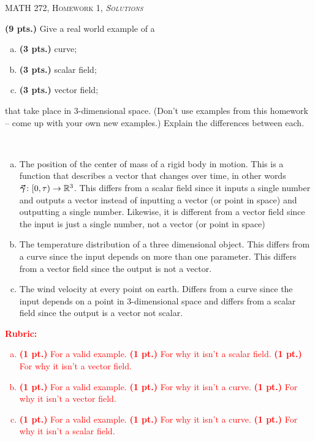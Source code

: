 \documentclass[12pt]{article} %
\begin{document}
\begin{center}
   \textsc{\large MATH 272, Homework 1, \emph{Solutions}}\\
\end{center}
\vspace{.5cm}

\begin{problem}
\textbf{(9 pts.)} Give a real world example of a
\begin{enumerate}[(a)]
    \item \textbf{(3 pts.)} curve;
    \item \textbf{(3 pts.)} scalar field;
    \item \textbf{(3 pts.)} vector field;
\end{enumerate}
that take place in 3-dimensional space. (Don't use examples from this homework -- come up with your own new examples.) Explain the differences between each.
\end{problem}
\begin{solution}~
\begin{enumerate}[(a)]
    \item The position of the center of mass of a rigid body in motion. This is a function that describes a vector that changes over time, in other words $\boldsymbol{\vec{\gamma}} \colon [0,\tau ) \to \mathbb{R}^3$. This differs from a scalar field since it inputs a single number and outputs a vector instead of inputting a vector (or point in space) and outputting a single number. Likewise, it is different from a vector field since the input is just a single number, not a vector (or point in space)
    \item The temperature distribution of a three dimensional object. This differs from a curve since the input depends on more than one parameter. This differs from a vector field since the output is not a vector.
    \item The wind velocity at every point on earth. Differs from a curve since the input depends on a point in 3-dimensional space and differs from a scalar field since the output is a vector not scalar.
\end{enumerate}
\end{solution}
\vspace*{1cm}
\textcolor{red}{
\noindent \textbf{Rubric:}
\begin{enumerate}[(a)]
    \item \textbf{(1 pt.)} For a valid example. \textbf{(1 pt.)} For why it isn't a scalar field. \textbf{(1 pt.)} For why it isn't a vector field.
    \item \textbf{(1 pt.)} For a valid example. \textbf{(1 pt.)} For why it isn't a curve. \textbf{(1 pt.)} For why it isn't a vector field.
    \item \textbf{(1 pt.)} For a valid example. \textbf{(1 pt.)} For why it isn't a curve. \textbf{(1 pt.)} For why it isn't a scalar field.
\end{enumerate}
}
\newpage
\end{document}
